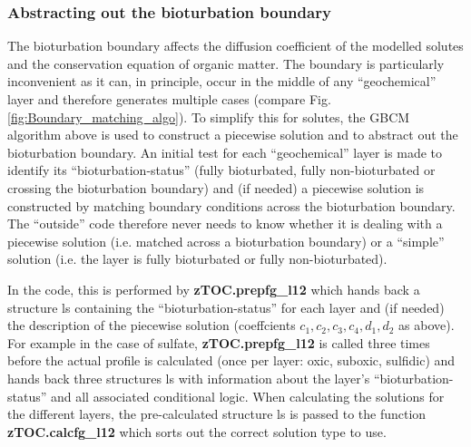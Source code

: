 \documentclass[gmd, manuscript]{copernicus}
\begin{document}
\subsubsection*{Abstracting out the bioturbation boundary}
The bioturbation boundary affects the diffusion coefficient of the modelled solutes and the conservation equation of organic matter. %
The boundary is particularly inconvenient as it can, in principle, occur in the middle of any ``geochemical'' layer and therefore generates multiple cases (compare Fig. \ref{fig:Boundary_matching_algo}). 
To simplify this for solutes, the GBCM algorithm above is used to construct a piecewise solution and to abstract out the bioturbation boundary. 
An initial test for each ``geochemical'' layer is made to identify its ``bioturbation-status'' (fully bioturbated, fully non-bioturbated or crossing the bioturbation boundary) and (if needed) a piecewise solution is 
constructed by matching boundary conditions across the bioturbation boundary. 
The ``outside'' code therefore never needs to know whether it is dealing with a piecewise solution (i.e. matched across a bioturbation boundary) or a ``simple'' solution (i.e. the layer is fully bioturbated
or fully non-bioturbated).

In the code, this is performed by \textsf{\textbf{zTOC.prepfg\_l12}} which hands back a structure \textsf{ls} containing the ``bioturbation-status'' for each layer and (if needed) 
the description of the piecewise solution (coeffcients $c_1, c_2, c_3, c_4, d_1, d_2$ as above). 
For example in the case of sulfate, \textsf{\textbf{zTOC.prepfg\_l12}} is called three times before the actual profile is calculated (once per layer: oxic, suboxic, sulfidic) 
and hands back three structures \textsf{ls} with information about the layer's ``bioturbation-status'' and all associated conditional logic. %
When calculating the solutions for the different layers, the pre-calculated structure \textsf{ls} is passed to the function \textsf{\textbf{zTOC.calcfg\_l12}} which sorts out the correct
solution type to use.
\end{document}
